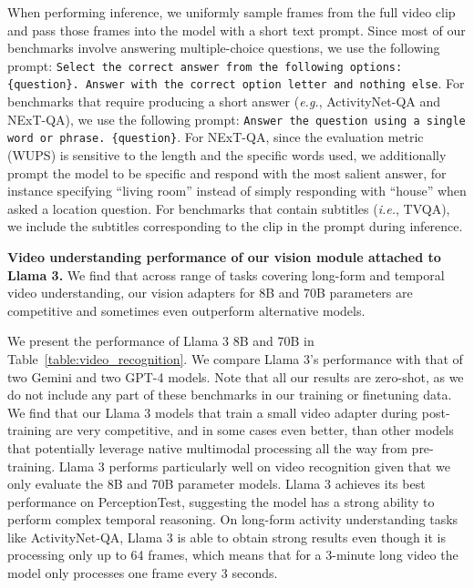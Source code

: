 When performing inference, we uniformly sample frames from the full video clip and pass those frames into the model with a short text prompt. Since most of our benchmarks involve answering multiple-choice questions, we use the following prompt: {\tt Select the correct answer from the following options: \{question\}.  Answer with the correct option letter and nothing else}. For benchmarks that require producing a short answer ({\em e.g.}, ActivityNet-QA and NExT-QA), we use the following prompt: {\tt Answer the question using a single word or phrase. \{question\}}. For NExT-QA, since the evaluation metric (WUPS) is sensitive to the length and the specific words used, we additionally prompt the model to be specific and respond with the most salient answer, for instance specifying ``living room'' instead of simply responding with ``house'' when asked a location question. For benchmarks that contain subtitles ({\em i.e.}, TVQA), we include the subtitles corresponding to the clip in the prompt during inference.

\begin{table}[t]
    \centering
    \resizebox{\linewidth}{!}{}
    \caption{\textbf{Video understanding performance of our vision module attached to Llama 3.} We find that across range of tasks covering long-form and temporal video understanding, our vision adapters for  8B and 70B parameters are competitive and sometimes even outperform alternative models.}
    \label{table:video_recognition}
\end{table}

We present the performance of Llama 3 8B and 70B in Table~\ref{table:video_recognition}.
We compare Llama 3's performance with that of two Gemini and two GPT-4 models. Note that all our results are zero-shot, as we do not include any part of these benchmarks in our training or finetuning data. We find that our Llama 3 models that train a small video adapter during post-training are very competitive, and in some cases even better, than other models that potentially leverage native multimodal processing all the way from pre-training.
Llama 3 performs particularly well on video recognition given that we only evaluate the 8B and 70B parameter models.
Llama 3 achieves its best performance on PerceptionTest, suggesting the model has a strong ability to perform complex temporal reasoning.  On long-form activity understanding tasks like ActivityNet-QA, Llama 3 is able to obtain strong results even though it is processing only up to 64 frames, which means that for a 3-minute long video the model only processes one frame every 3 seconds.
